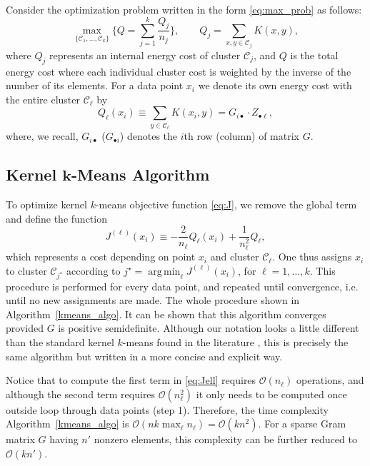 \documentclass[aps,preprint,nofootinbib,floatfix]{revtex4-1}
\DeclareMathOperator*{\argmin}{arg\,min}
\newcommand\kk{K}
\newcommand\C{{\mathcal{C}}}
\newcommand\OO{{\mathcal{O}}}
\begin{document}
Consider the optimization problem 
written in the form \eqref{eq:max_prob} as follows:
\begin{equation}
\label{eq:maxQ}
\max_{\{ \C_1,\dotsc,\C_k \}} 
\bigg\{ Q = \sum_{j=1}^k \dfrac{Q_j}{n_j}  \bigg\},
\qquad Q_j = \sum_{x,y\in\C_j} \kk(x,y),
\end{equation}
where $Q_j$ represents an internal energy cost of cluster $\C_j$, and
$Q$ is the total energy cost where each individual cluster cost 
is weighted by the inverse
of the number of its elements. For a data point $x_i$ we denote
its own energy cost
with the entire cluster $\C_\ell$ by
\begin{equation}
\label{eq:costxij}
Q_\ell(x_i) \equiv \sum_{y\in\C_\ell} \kk(x_i, y) = 
G_{i \bullet} \cdot Z_{\bullet \ell},
\end{equation}
where, we recall, $G_{i\bullet}$ ($G_{\bullet i}$) denotes
the $i$th row (column) of matrix $G$.

\subsection{Kernel $\bm{k}$-Means Algorithm}

To optimize kernel $k$-means objective function
\eqref{eq:J}, we remove the global term and define the function
\begin{equation}
\label{eq:Jell}
J^{(\ell)}(x_i) \equiv -\dfrac{2}{n_\ell} Q_\ell(x_i) + \dfrac{1}{n_\ell^2}
Q_\ell,
\end{equation}
which represents a cost depending on point $x_i$ and cluster $\C_\ell$. One
thus assigns  $x_i$ to cluster $\C_{j^\star}$ according
to $j^\star = \argmin_\ell J^{(\ell)}(x_i)$, for $\ell = 1,\dotsc,k$.
This procedure is performed for every data point, and repeated until
convergence, i.e. until no new assignments are made.
The whole procedure shown in Algorithm~\ref{kmeans_algo}.
It can be shown that this algorithm converges provided $G$ is positive
semidefinite.
Although our notation looks a little different than the standard
kernel $k$-means found in the literature \cite{Dhillon2,Dhillon}, 
this is precisely
the same algorithm but written in a more concise and explicit way.

Notice that to compute the first term in \eqref{eq:Jell} requires
$\OO(n_\ell)$ operations, and although the second term requires
$\OO(n_\ell^2)$ it only needs to be computed once outside loop through
data points (step 1).
Therefore, the time complexity Algorithm~\ref{kmeans_algo} is
$\OO(n k \max_\ell n_\ell) = \OO(k n^2)$. For a sparse
Gram matrix $G$ having
$n'$ nonzero elements, this complexity can be further reduced
to $\OO(k n')$. 
\end{document}
